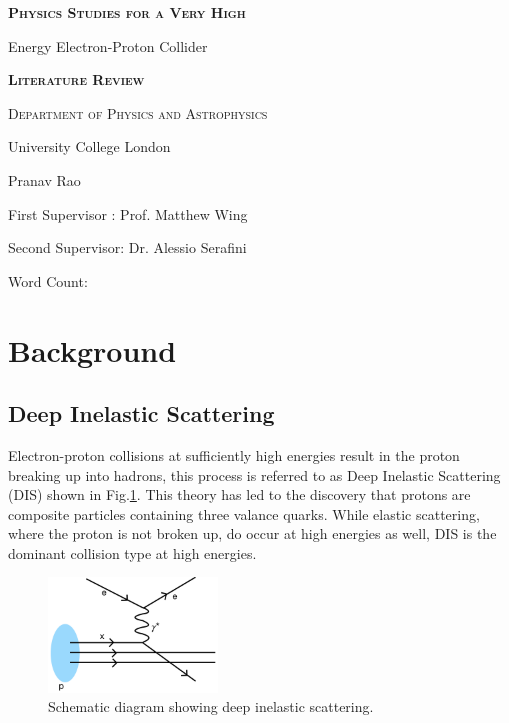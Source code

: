 \documentclass[journal, a4paper,11pt]{IEEEtran}
\begin{document}
\begin{titlepage}
	\centering
    \vspace{2cm}
    {\scshape\LARGE\bfseries Physics Studies for a Very High \par Energy Electron-Proton Collider\par}
    \vspace{2cm}
	{\scshape\Large\bfseries Literature Review\par}
	\vspace{2cm}
	{\scshape\Large Department of Physics and Astrophysics\par University College London\par}
	\vspace{4cm}
	{\huge\bfseries\par}
	{\large Pranav Rao\par}
	{\large First Supervisor : Prof. Matthew Wing\par Second Supervisor: Dr. Alessio Serafini\par}
	\vspace{8cm}
	Word Count: 

	\vfill
\end{titlepage}

    
\justify
\section{Background}

\subsection*{\textbf{Deep Inelastic Scattering}}

Electron-proton collisions at sufficiently high energies result in the proton breaking up into hadrons, this process is referred to as Deep Inelastic Scattering (DIS) shown in Fig.\ref{fig:DIS}. This theory has led to the discovery that protons are composite particles containing three valance quarks. While elastic scattering, where the proton is not broken up, do occur at high energies as well, DIS is the dominant collision type at high energies.

\begin{figure}[!h]
	\centering
		\includegraphics[width =0.4\textwidth]{DIS.png}
		\caption{Schematic diagram showing deep inelastic scattering.}
		\label{fig:DIS}
\end{figure}
\end{document}
